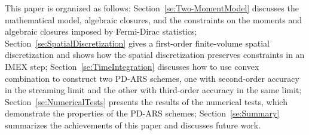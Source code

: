 This paper is organized as follows: Section~\ref{se:Two-MomentModel} discusses the mathematical model, algebraic closures, and the constraints on the moments and algebraic closures imposed by Fermi-Dirac statistics;
Section~\ref{se:SpatialDiscretization} gives a first-order finite-volume spatial discretization and shows how the spatial discretization preserves constraints in an IMEX step;
Section~\ref{se:TimeIntegration} discusses how to use convex combination to construct two PD-ARS schemes, one with second-order accuracy in the streaming limit and the other with third-order accuracy in the same limit;
Section~\ref{se:NumericalTests} presents the results of the numerical tests, which demonstrate the properties of the PD-ARS schemes; Section~\ref{se:Summary} summarizes the achievements of this paper and discusses future work.